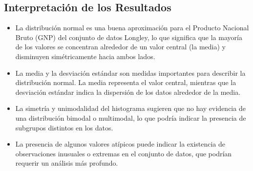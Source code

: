 \documentclass{article}
\begin{document}
\begin{itemize}
    \section{Interpretación de los Resultados} \begin{itemize}
        \item La distribución normal es una buena aproximación para el Producto Nacional Bruto (GNP) del conjunto de datos Longley, lo que significa que la mayoría de los valores se concentran alrededor de un valor central (la media) y disminuyen simétricamente hacia ambos lados.
        \item La media y la desviación estándar son medidas importantes para describir la distribución normal. La media representa el valor central, mientras que la desviación estándar indica la dispersión de los datos alrededor de la media.
        \item La simetría y unimodalidad del histograma sugieren que no hay evidencia de una distribución bimodal o multimodal, lo que podría indicar la presencia de subgrupos distintos en los datos.
        \item La presencia de algunos valores atípicos puede indicar la existencia de observaciones inusuales o extremas en el conjunto de datos, que podrían requerir un análisis más profundo.
        \end{itemize}
    

\end{itemize}
\end{document}
